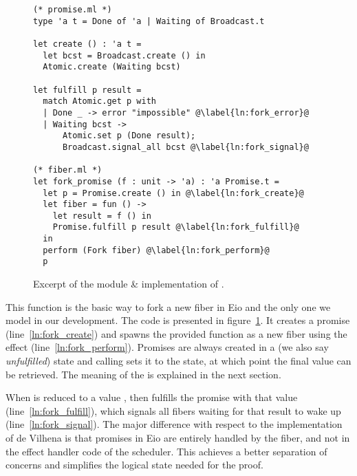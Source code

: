 \begin{figure}[ht]
  \begin{verbatim}
(* promise.ml *)
type 'a t = Done of 'a | Waiting of Broadcast.t

let create () : 'a t = 
  let bcst = Broadcast.create () in
  Atomic.create (Waiting bcst)

let fulfill p result =
  match Atomic.get p with
  | Done _ -> error "impossible" @\label{ln:fork_error}@
  | Waiting bcst ->
      Atomic.set p (Done result);
      Broadcast.signal_all bcst @\label{ln:fork_signal}@
  
(* fiber.ml *)
let fork_promise (f : unit -> 'a) : 'a Promise.t =
  let p = Promise.create () in @\label{ln:fork_create}@
  let fiber = fun () ->
    let result = f () in
    Promise.fulfill p result @\label{ln:fork_fulfill}@
  in
  perform (Fork fiber) @\label{ln:fork_perform}@
  p
  \end{verbatim}
  \caption{Excerpt of the  module \& implementation of .}
  \label{fig:sched-impl-fork}
\end{figure}

This function is the basic way to fork a new fiber in Eio and the only one we model in our development.
The code is presented in figure~\ref{fig:sched-impl-fork}.
It creates a promise (line~\ref{ln:fork_create}) and spawns the provided function as a new fiber using the \efork{} effect (line~\ref{ln:fork_perform}).
Promises are always created in a  (we also say \emph{unfulfilled}) state and calling  sets it to the  state, at which point the final value can be retrieved.
The meaning of the  is explained in the next section.

When  is reduced to a value ,  then fulfills the promise with that value (line~\ref{ln:fork_fulfill}), which signals all fibers waiting for that result to wake up (line~\ref{ln:fork_signal}).
The major difference with respect to the implementation of de Vilhena is that promises in Eio are entirely handled by the fiber, and not in the effect handler code of the scheduler.
This achieves a better separation of concerns and simplifies the logical state needed for the proof.

\subsubsection{}
\label{sec:sched-impl-await}

